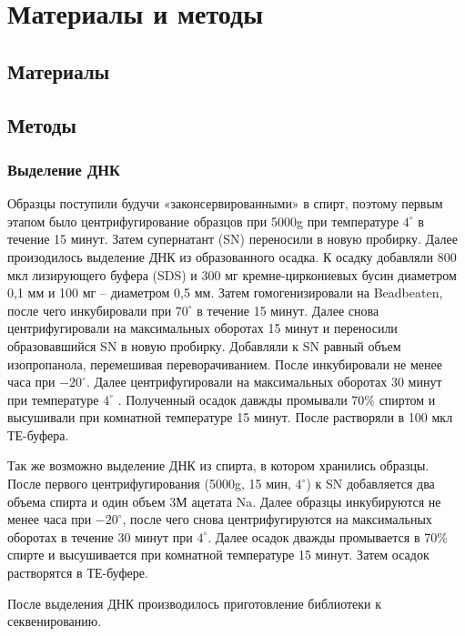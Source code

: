 \chapter{Материалы и методы} \label{chapt1}

\section{Материалы} \label{sect1_1}



\section{Методы} \label{sect1_2}

\subsection{Выделение ДНК} \label{subsect1_2_1}

Образцы поступили будучи «законсервированными» в спирт, поэтому первым этапом было центрифугирование образцов при 5000g при температуре $4^{\circ}$ в течение 15 минут. Затем супернатант (SN) переносили в новую пробирку. Далее произодилось выделение ДНК из образованного осадка. К осадку добавляли 800 мкл лизирующего буфера (SDS) и 300 мг кремне-циркониевых бусин диаметром 0,1 мм и 100 мг – диаметром 0,5 мм. Затем гомогенизировали на Beadbeaten, после чего инкубировали при $70^{\circ}$ в течение 15 минут. Далее снова центрифугировали на максимальных оборотах 15 минут и переносили образовавшийся SN в новую пробирку. Добавляли к SN равный объем изопропанола, перемешивая переворачиванием. После инкубировали не менее часа при $-20^{\circ}$. Далее центрифугировали на максимальных оборотах 30 минут при температуре $4^{\circ}$ . Полученный осадок давжды промывали 70\% спиртом и высушивали при комнатной температуре 15 минут. После растворяли в 100 мкл ТЕ-буфера. 

Так же возможно выделение ДНК из спирта, в котором хранились образцы. После первого центрифугирования (5000g, 15 мин, $4^{\circ}$) к SN добавляется два объема спирта и один объем 3М ацетата Na. Далее образцы инкубируются не менее часа при $-20^{\circ}$, после чего снова центрифугируются на максимальных оборотах в течение 30 минут при $4^{\circ}$. Далее осадок дважды промывается в 70\% спирте и высушивается при комнатной температуре 15 минут. Затем осадок растворятся в ТЕ-буфере. 

После выделения ДНК производилось приготовление библиотеки к секвенированию.


